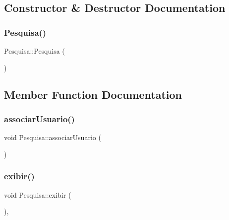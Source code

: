 \subsection{Constructor \& Destructor Documentation}
\mbox{\label{class_pesquisa_a010148be71942e2cdc94bc0ace0c911c}} 
\subsubsection{\texorpdfstring{Pesquisa()}{Pesquisa()}}
{\footnotesize\ttfamily Pesquisa\+::\+Pesquisa (\begin{DoxyParamCaption}{ }\end{DoxyParamCaption})}



\subsection{Member Function Documentation}
\mbox{\label{class_pesquisa_afef000de3cde966df1e84cec1c95ca4d}} 
\subsubsection{\texorpdfstring{associar\+Usuario()}{associarUsuario()}}
{\footnotesize\ttfamily void Pesquisa\+::associar\+Usuario (\begin{DoxyParamCaption}{ }\end{DoxyParamCaption})\hspace{0.3cm}{\ttfamily [private]}}

\mbox{\label{class_pesquisa_a6184f213f4535f9c39900e6f41f05277}} 
\subsubsection{\texorpdfstring{exibir()}{exibir()}}
{\footnotesize\ttfamily void Pesquisa\+::exibir (\begin{DoxyParamCaption}{ }\end{DoxyParamCaption})\hspace{0.3cm}{\ttfamily [override]}, {\ttfamily [virtual]}}



